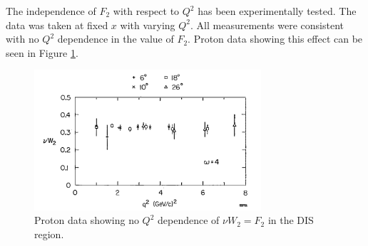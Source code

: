 The independence of $F_2$ with respect to $Q^2$ has been experimentally tested. The data was taken at fixed $x$ with varying $Q^2$. All measurements were consistent with no $Q^2$ dependence in the value of $F_2$. Proton data showing this effect can be seen in Figure \ref{fig:noQ2F2}.

\begin{figure}
\begin{center}
	\includegraphics[width=0.75\textwidth]{./scattering/fig/no_q2_dep.png}
	\caption{Proton data showing no $Q^2$ dependence of $\nu W_2=F_2$ in the DIS region.\cite{FriedmanKendall}}
	\label{fig:noQ2F2}
\end{center}
\end{figure}